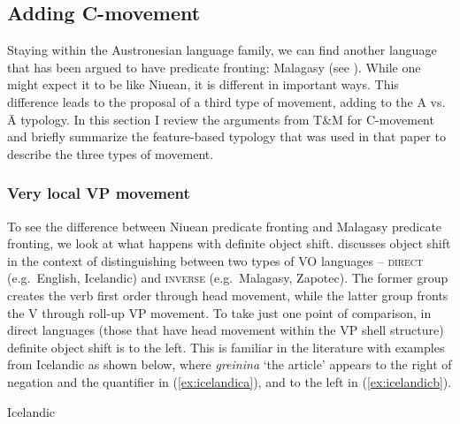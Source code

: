 \documentclass[output=paper,colorlinks,citecolor=brown,
]{langscibook}
\begin{document}
\subsection{Adding C-movement}

Staying within the Austronesian language family, we can find another language that has been argued to have predicate fronting: Malagasy (see \citealt{Pearson:1997,Pearson:2018,Rackowski:1998,Rackowski:2000}).  While one might expect it to be  like Niuean, it is different in important ways.  This difference leads to the proposal of a third type of movement, adding to the A vs. \=A typology.  In this section I review the arguments from T\&M for C-movement and briefly summarize the feature-based typology that was used in that paper to describe the three types of movement.


\subsubsection{Very local VP movement}

To see the difference between Niuean predicate fronting and Malagasy predicate fronting, we look at what happens with definite object shift.  \citet{Pearson:2000} discusses object shift in the context of distinguishing between two types of VO languages -- \textsc{direct} (e.g.\ English, Icelandic) and \textsc{inverse} (e.g.\ Malagasy, Zapotec).  The former group creates the verb first order through head movement, while the latter group fronts the V through roll-up VP movement.  To take just one point of comparison, in direct languages (those that have head movement within the VP shell structure) definite object shift is to the left.  This is familiar in the literature with examples from Icelandic as shown below, where \textit{greinina} `the article' appears to the right of negation and the quantifier in (\ref{ex:icelandica}), and to the left in (\ref{ex:icelandicb}).  

\ea Icelandic \citep[166]{Holmberg:1986}
    \z
\z
\end{document}

